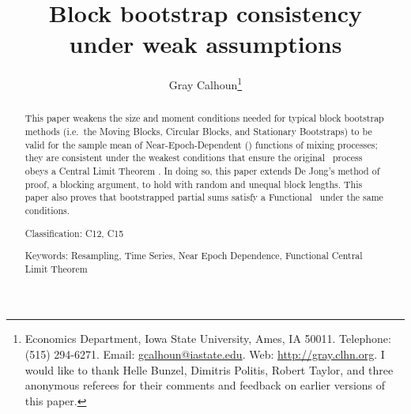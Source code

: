 \documentclass[11pt]{article}
\begin{document}
\author{Gray Calhoun\thanks{Economics Department, Iowa State
    University, Ames, IA 50011. Telephone: (515) 294-6271.  Email:
    \protect\url{gcalhoun@iastate.edu}. Web:
    \protect\url{http://gray.clhn.org}.  I would like to thank
    Helle Bunzel, Dimitris Politis, Robert Taylor, and three anonymous
    referees for their comments and feedback on earlier versions of
    this paper.}}

\title{Block bootstrap consistency\\under weak assumptions}

\maketitle

\begin{abstract}\noindent
  This paper weakens the size and moment conditions needed for typical
  block bootstrap methods (i.e.\ the Moving Blocks, Circular Blocks,
  and Stationary Bootstraps) to be valid for the sample mean of
  Near-Epoch-Dependent (\ned) functions of mixing processes; they are
  consistent under the weakest conditions that ensure the original
  \ned\ process obeys a Central Limit Theorem \citep[those
    of][\textit{Econometric Theory}]{Jon:97}.  In doing so, this paper
  extends De Jong's method of proof, a blocking argument, to hold with
  random and unequal block lengths.  This paper also proves that
  bootstrapped partial sums satisfy a Functional \clt\ under the same
  conditions.

  \noindent {} Classification: C12, C15

  \noindent Keywords: Resampling, Time Series, Near Epoch Dependence,
  Functional Central Limit Theorem
\end{abstract}
\end{document}

